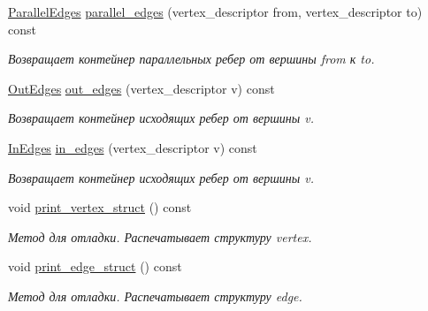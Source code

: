 \begin{DoxyCompactItemize}
\hyperlink{class_s_p_u___g_r_a_p_h_1_1_spu_ultra_graph_1_1_parallel_edges}{Parallel\+Edges} \hyperlink{class_s_p_u___g_r_a_p_h_1_1_spu_ultra_graph_a95e3d9d5f45f98173847d5a0254a4a1f}{parallel\+\_\+edges} (vertex\+\_\+descriptor from, vertex\+\_\+descriptor to) const
\begin{DoxyCompactList}\small\item\em Возвращает контейнер параллельных ребер от вершины from к to. \end{DoxyCompactList}\item 
\mbox{\label{class_s_p_u___g_r_a_p_h_1_1_spu_ultra_graph_ab1bda5ef7eb9a69b09c044b3365ee4d4}} 
\hyperlink{class_s_p_u___g_r_a_p_h_1_1_spu_ultra_graph_ae0fda272e54e0400446887572a5b4587}{Out\+Edges} \hyperlink{class_s_p_u___g_r_a_p_h_1_1_spu_ultra_graph_ab1bda5ef7eb9a69b09c044b3365ee4d4}{out\+\_\+edges} (vertex\+\_\+descriptor v) const
\begin{DoxyCompactList}\small\item\em Возвращает контейнер исходящих ребер от вершины v. \end{DoxyCompactList}\item 
\mbox{\label{class_s_p_u___g_r_a_p_h_1_1_spu_ultra_graph_a43c59a6f12d139a9bcf98e00e8c4297a}} 
\hyperlink{class_s_p_u___g_r_a_p_h_1_1_spu_ultra_graph_a3fc2875b9d11620ffa74cd83e544a95e}{In\+Edges} \hyperlink{class_s_p_u___g_r_a_p_h_1_1_spu_ultra_graph_a43c59a6f12d139a9bcf98e00e8c4297a}{in\+\_\+edges} (vertex\+\_\+descriptor v) const
\begin{DoxyCompactList}\small\item\em Возвращает контейнер исходящих ребер от вершины v. \end{DoxyCompactList}\item 
\mbox{\label{class_s_p_u___g_r_a_p_h_1_1_spu_ultra_graph_af5d0c196f4acbc30f17a2444c384b8af}} 
void \hyperlink{class_s_p_u___g_r_a_p_h_1_1_spu_ultra_graph_af5d0c196f4acbc30f17a2444c384b8af}{print\+\_\+vertex\+\_\+struct} () const
\begin{DoxyCompactList}\small\item\em Метод для отладки. Распечатывает структуру vertex. \end{DoxyCompactList}\item 
\mbox{\label{class_s_p_u___g_r_a_p_h_1_1_spu_ultra_graph_a3bb6913fcff6a6ea7571e7b3e338a6a7}} 
void \hyperlink{class_s_p_u___g_r_a_p_h_1_1_spu_ultra_graph_a3bb6913fcff6a6ea7571e7b3e338a6a7}{print\+\_\+edge\+\_\+struct} () const
\begin{DoxyCompactList}\small\item\em Метод для отладки. Распечатывает структуру edge. \end{DoxyCompactList}\end{DoxyCompactItemize}
